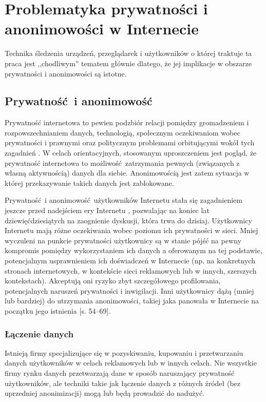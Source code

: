 \chapter{Problematyka prywatności i anonimowości w Internecie}
Technika śledzenia urządzeń, przeglądarek i użytkowników o której traktuje ta
praca jest ,,chodliwym'' tematem głównie dlatego, że jej implikacje w obszarze
prywatności i anonimowości są istotne.

\section{Prywatność i anonimowość}
Prywatność internetowa to pewien podzbiór relacji pomiędzy gromadzeniem i
rozpowszechnianiem danych, technologią, społecznym oczekiwaniom wobec
prywatności i prawnymi oraz politycznym problemami orbitującymi wokół tych
zagadnień \cite{michael2014uberveillance}. W celach orientacyjnych, stosowanym
uproszczeniem jest pogląd, że prywatność internetowa to możliwość zatrzymania
pewnych (związanych z własną aktywnością) danych dla siebie. Anonimowością jest
zatem sytuacja w której przekazywanie takich danych jest zablokowane.

Prywatność i anonimowość użytkowników Internetu stała się zagadnieniem jeszcze
przed nadejściem ery Internetu \cite{david1965some}, pozwalając na koniec lat
dziewięćdziesiątych na zaognienie dyskusji, która trwa do dzisiaj. Użytkownicy
Internetu mają różne oczekiwania wobec poziomu ich prywatności w sieci. Mniej
wyczuleni na punkcie prywatności użytkownicy są w stanie pójść na pewny
kompromis pomiędzy wykorzystaniem ich danych a oferowanym na tej podstawie,
potencjalnym usprawnieniem ich doświadczeń w Internecie (np. na konkretnych
stronach internetowych, w kontekście sieci reklamowych lub w innych, szerszych
kontekstach). Akceptują oni ryzyko zbyt szczegółowego profilowania,
potencjalnych naruszeń prywatności i inwigilacji. Inni użytkownicy dążą (mniej
lub bardziej) do utrzymania anonimowości, takiej jaka panowała w Internecie na
początku jego istnienia \cite{snowden2019pamiec}[s. 54--69].

\subsection{Łączenie danych}
Istnieją firmy specjalizujące się w pozyskiwaniu, kupowaniu i przetwarzaniu
danych użytkowników w celach reklamowych lub w innych celach. Nie wszystkie
firmy rynku danych przetwarzają dane w sposób naruszający prywatność
użytkowników, ale techniki takie jak łączenie danych z różnych źródeł (bez
uprzedniej anonimizacji) mogą lub będą prowadzić do nadużyć.

